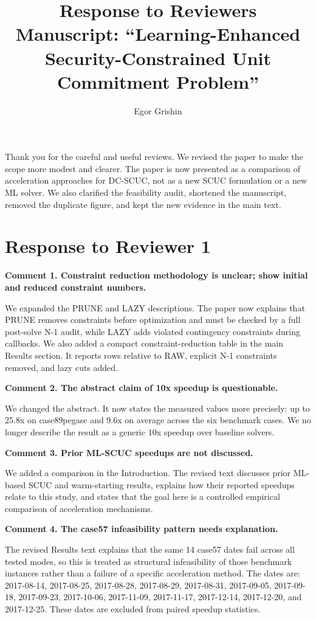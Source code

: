\documentclass[11pt,a4paper]{article}
\title{Response to Reviewers\\
\large Manuscript: ``Learning-Enhanced Security-Constrained Unit Commitment Problem''}
\author{Egor Grishin}
\date{}
\begin{document}
\maketitle

Thank you for the careful and useful reviews. We revised the paper to make the scope more modest and clearer. The paper is now presented as a comparison of acceleration approaches for DC-SCUC, not as a new SCUC formulation or a new ML solver. We also clarified the feasibility audit, shortened the manuscript, removed the duplicate figure, and kept the new evidence in the main text.

\section*{Response to Reviewer 1}

\textbf{Comment 1. Constraint reduction methodology is unclear; show initial and reduced constraint numbers.}

We expanded the PRUNE and LAZY descriptions. The paper now explains that PRUNE removes constraints before optimization and must be checked by a full post-solve N-1 audit, while LAZY adds violated contingency constraints during callbacks. We also added a compact constraint-reduction table in the main Results section. It reports rows relative to RAW, explicit N-1 constraints removed, and lazy cuts added.

\textbf{Comment 2. The abstract claim of 10x speedup is questionable.}

We changed the abstract. It now states the measured values more precisely: up to 25.8x on case89pegase and 9.6x on average across the six benchmark cases. We no longer describe the result as a generic 10x speedup over baseline solvers.

\textbf{Comment 3. Prior ML-SCUC speedups are not discussed.}

We added a comparison in the Introduction. The revised text discusses prior ML-based SCUC and warm-starting results, explains how their reported speedups relate to this study, and states that the goal here is a controlled empirical comparison of acceleration mechanisms.

\textbf{Comment 4. The case57 infeasibility pattern needs explanation.}

The revised Results text explains that the same 14 case57 dates fail across all tested modes, so this is treated as structural infeasibility of those benchmark instances rather than a failure of a specific acceleration method. The dates are: 2017-08-14, 2017-08-25, 2017-08-28, 2017-08-29, 2017-08-31, 2017-09-05, 2017-09-18, 2017-09-23, 2017-10-06, 2017-11-09, 2017-11-17, 2017-12-14, 2017-12-20, and 2017-12-25. These dates are excluded from paired speedup statistics.
\end{document}
